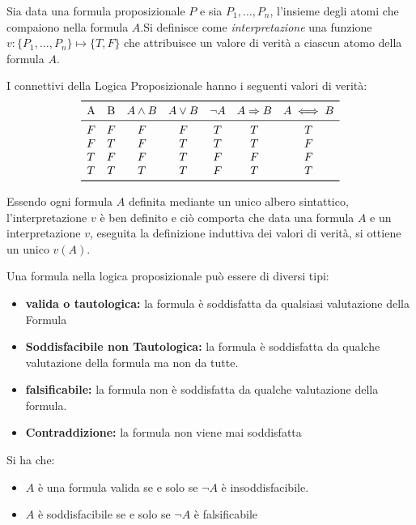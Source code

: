\documentclass[a4paper,12pt, oneside]{book}
\begin{document}
\begin{definizione}
  Sia data una formula proposizionale $P$ e sia ${P_1,\dots,P_n}$, l'insieme
  degli 
  atomi che compaiono nella formula $A$.Si definisce come \emph{interpretazione}
  una 
  funzione $v:\{P_1,\dots,P_n\} \mapsto \{T,F\}$ che attribuisce un valore di
  verità 
  a ciascun atomo della formula $A$.
\end{definizione}

I connettivi della Logica Proposizionale hanno i seguenti valori di verità:
\[
  \begin{array}{ccccccc}
    \toprule
    \text{A} & \text{B} & A \land B & A \lor B & \neg A & A \Rightarrow B & A \iff B \\
    \midrule
    F & F & F & F & T & T & T \\
    F & T & F & T & T & T & F \\
    T & F & F & T & F & F & F \\
    T & T & T & T & F & T & T \\
    \bottomrule
  \end{array}
\]

Essendo ogni formula $A$ definita mediante un unico albero sintattico,
l'interpretazione $v$ 
è ben definito e ciò comporta che data una formula $A$ e un interpretazione
$v$, 
eseguita la definizione induttiva dei valori di verità, si ottiene un unico
$v(A)$. 

\begin{definizione}
  Una formula nella logica proposizionale può essere di diversi tipi:
  \begin{itemize}
    \item \textbf{valida o tautologica:} la formula è soddisfatta da qualsiasi
    valutazione della Formula 
    \item \textbf{Soddisfacibile non Tautologica:} la formula è soddisfatta da
    qualche valutazione 
    della formula ma non da tutte.
    \item \textbf{falsificabile:} la formula non è soddisfatta da qualche
    valutazione della formula. 
    \item \textbf{Contraddizione:} la formula non viene mai soddisfatta
  \end{itemize}
\end{definizione}

\begin{teorema}
  Si ha che:
  \begin{itemize}
    \item $A$ è una formula valida se e solo se $\neg A$ è insoddisfacibile.
    \item $A$ è soddisfacibile se e solo se $\neg A$ è falsificabile
  \end{itemize}
\end{teorema}
\end{document}
